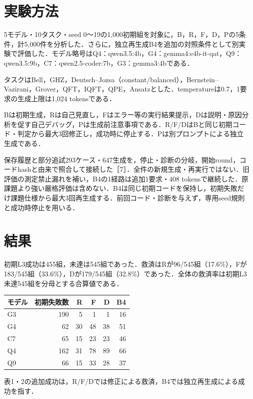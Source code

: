 \documentclass[a4paper,10pt,twocolumn]{extarticle}
\begin{document}
\newpage
\section{実験方法}
5モデル・10タスク・seed 0〜19の1,000初期組を対象に，B，R，F，D，Pの5条件，計5,000件を分析した．さらに，独立再生成B4を追加の対照条件として別実験で評価した．モデル略号はQ4：qwen3.5:4b，G4：gemma4:e4b-it-qat，Q9：qwen3.5:9b，C7：qwen2.5-coder:7b，G3：gemma3:4bである．

タスクはBell，GHZ，Deutsch–Jozsa（constant/balanced），Bernstein–Vazirani，Grover，QFT，IQFT，QPE，Ansatzとした．temperatureは0.7，1要求の生成上限は1,024 tokensである．

Bは初期生成，Rは自己見直し，Fはエラー等の実行結果提示，Dは説明・原因分析を促す自己デバッグ，Pは生成前注意事項である．R/F/DはBと同じ初期コード・判定から最大3回修正し，成功時に停止する．Pは別プロンプトによる独立生成である．

保存履歴と部分追試293ケース・647生成を，停止・診断の分岐，開始round，コードhashと由来で照合して接続した［7］．全件の新規生成・再実行ではない．旧評価の測定禁止漏れを補い，B4の1経路は追加1要求・408 tokensで継続した．原課題より強い厳格評価は含めない．B4は同じ初期コードを保持し，初期失敗だけ課題仕様から最大3回再生成する．前回コード・診断を与えず，専用seed規則と成功時停止を用いる．

\section{結果}
初期L3成功は455組，未達は545組であった．救済はRが96/545組（17.6\%），Fが183/545組（33.6\%），Dが179/545組（32.8\%）であった．全体の救済率は初期L3未達545組を分母とする合算値である．

\begin{center}\begin{minipage}{\linewidth}\centering
{}
\begin{tabular}{@{}lrrrrr@{}}\hline
モデル & 初期失敗数 & R & F & D & B4\\\hline
G3 & 190 & 5 & 1 & 1 & 16\\
G4 & 62 & 30 & 48 & 38 & 51\\
C7 & 65 & 15 & 23 & 23 & 46\\
Q4 & 162 & 31 & 78 & 89 & 66\\
Q9 & 66 & 15 & 33 & 28 & 37\\
\hline\end{tabular}\end{minipage}\end{center}
表1・2の追加成功は，R/F/Dでは修正による救済，B4では独立再生成による成功を指す．
\end{document}

